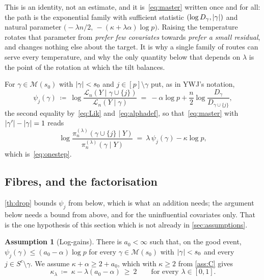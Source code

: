 \documentclass[aos]{imsart}
\DeclarePairedDelimiter{\abs}{\lvert}{\rvert}
\theoremstyle{plain}
\theoremstyle{definition}
\newtheorem{assumption}{Assumption}[section]
\begin{document}
    This is an identity, not an estimate, and it is~\eqref{eq:master} written
    once and for all: the path is the exponential family with sufficient
    statistic $(\log D_\gamma,\abs\gamma)$ and natural parameter
    $\bigl(-\lambda n/2,\,-(\kappa+\lambda\alpha)\log p\bigr)$. Raising the
    temperature rotates that parameter from \emph{prefer few covariates}
    towards \emph{prefer a small residual}, and changes nothing else about
    the target. It is why a single family of routes can serve every
    temperature, and why the only quantity below that depends on $\lambda$ is
    the point of the rotation at which the tilt balances.

    For $\gamma\in\mathscr{M}(s_0)$ with $\abs\gamma<s_0$ and
    $j\in[p]\setminus\gamma$ put, as in YWJ's notation,
    \begin{equation}
        \label{eq:psidef}
        \psi_j(\gamma)\ \coloneq\
        \log\frac{\mathcal{L}_n(Y\mid\gamma\cup\{j\})}
        {\mathcal{L}_n(Y\mid\gamma)}
        \ =\ -\alpha\log p+\frac n2\log\frac{D_\gamma}
        {D_{\gamma\cup\{j\}}} ,
    \end{equation}
    the second equality by~\eqref{eq:Lik} and~\eqref{eq:alphadef}, so
    that~\eqref{eq:master} with $\abs{\gamma'}-\abs\gamma=1$ reads
    \begin{equation}
        \label{eq:onestepG}
        \log\frac{\pi_n^{(\lambda)}(\gamma\cup\{j\}\mid Y)}
        {\pi_n^{(\lambda)}(\gamma\mid Y)}
        \ =\ \lambda\,\psi_j(\gamma)-\kappa\log p ,
    \end{equation}
    which is~\eqref{eq:onestep}.

    \subsection{Fibres, and the factorisation}
    \label{sub:fibres}

    \cref{th:drop} bounds $\psi_j$ from below, which is what an addition
    needs; the argument below needs a bound from above, and for the
    uninfluential covariates only. That is the one hypothesis of this
    section which is not already in \cref{sec:assumptions}.

    \begin{assumption}[Log-gains]
        \label{ass:twosided}
        There is $a_0<\infty$ such that, on the good event,
        $\psi_j(\gamma)\leq(a_0-\alpha)\log p$ for every
        $\gamma\in\mathscr{M}(s_0)$ with $\abs\gamma<s_0$ and every
        $j\in S^{c}\setminus\gamma$. We assume $\kappa+\alpha\geq2+a_0$,
        which with $\kappa\geq2$ from \cref{ass:C} gives
        \begin{equation}
            \label{eq:kappalam}
            \kappa_\lambda\ \coloneq\ \kappa-\lambda(a_0-\alpha)\ \geq\ 2
            \qquad\text{for every }\lambda\in[0,1] .
        \end{equation}
    \end{assumption}
\end{document}
